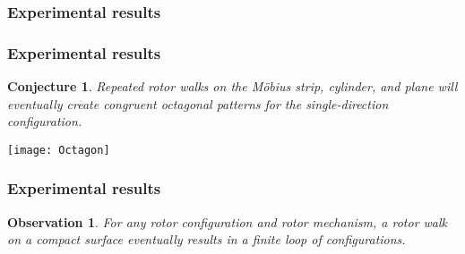 \documentclass{beamer}
\newtheorem{conj}{Conjecture}
\newtheorem{observe}{Observation}
\begin{document}

\begin{frame}
	\frametitle{Experimental results}
	
\end{frame}


\begin{frame}
	\frametitle{Experimental results}
	
	\begin{conj}
		Repeated rotor walks on the M{\"o}bius strip, cylinder, and plane will eventually create congruent octagonal patterns for the single-direction configuration.
	\end{conj}
	


	
\pause	
	\hspace{0.8cm}
	
	\texttt{[image: Octagon]}

\end{frame}


\begin{frame}
	\frametitle{Experimental results}
	
	\begin{observe}
		For any rotor configuration and rotor mechanism, a rotor walk on a compact surface eventually results in a finite loop of configurations.
	\end{observe}

\end{frame}
\end{document}
